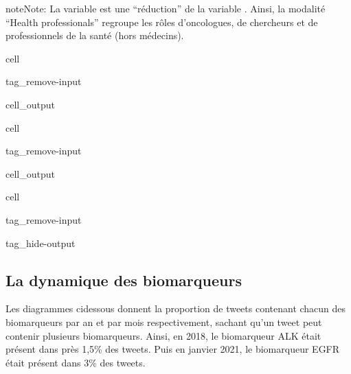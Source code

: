 \documentclass[letterpaper,10pt,english]{jupyterBook}
\begin{document}
\begin{sphinxShadowBox}
\sphinxstylesidebartitle{}

\begin{sphinxadmonition}{note}{Note:}
\sphinxAtStartPar
La variable  est une “réduction” de la variable . Ainsi, la modalité “Health professionals” regroupe les rôles d’oncologues, de chercheurs et de professionnels de la santé (hors médecins).
\end{sphinxadmonition}
\end{sphinxShadowBox}

\begin{sphinxuseclass}{cell}
\begin{sphinxuseclass}{tag_remove-input}\begin{sphinxVerbatimOutput}

\begin{sphinxuseclass}{cell_output}
\end{sphinxuseclass}\end{sphinxVerbatimOutput}

\end{sphinxuseclass}
\end{sphinxuseclass}
\begin{sphinxuseclass}{cell}
\begin{sphinxuseclass}{tag_remove-input}\begin{sphinxVerbatimOutput}

\begin{sphinxuseclass}{cell_output}
\end{sphinxuseclass}\end{sphinxVerbatimOutput}

\end{sphinxuseclass}
\end{sphinxuseclass}
\begin{sphinxuseclass}{cell}
\begin{sphinxuseclass}{tag_remove-input}
\begin{sphinxuseclass}{tag_hide-output}
\end{sphinxuseclass}
\end{sphinxuseclass}
\end{sphinxuseclass}

\subsection{La dynamique des biomarqueurs}
\label{\detokenize{analyse_preleminaire:la-dynamique-des-biomarqueurs}}
\sphinxAtStartPar
Les diagrammes ci\sphinxhyphen{}dessous donnent la proportion de tweets contenant chacun des biomarqueurs par an et par mois respectivement, sachant qu’un tweet peut contenir plusieurs biomarqueurs. Ainsi, en 2018, le biomarqueur ALK était présent dans près 1,5\% des tweets. Puis en janvier 2021, le biomarqueur EGFR était présent dans 3\% des tweets.
\end{document}
